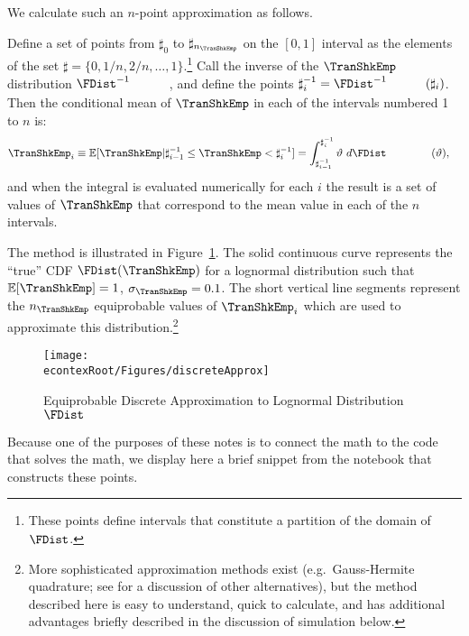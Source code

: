 \documentclass[titlepage, headings=optiontotocandhead]{Resources/texmf-local/tex/latex/econtex}
\begin{document}
We calculate such an $n$-point approximation as follows.

Define a set of points from $\sharp_{0}$ to $\sharp_{n_{\TranShkEmp}}$ on the $[0,1]$ interval
as the elements of the set $\sharp = \{0,1/n,2/n, \ldots,1\}$.\footnote{These points define intervals that constitute a partition of the domain of $\FDist$.}  Call the inverse of the $\TranShkEmp$ distribution $\FDist^{-1}_{\phantom{\TranShkEmp}}$, and define the
points $\sharp^{-1}_{i} = \FDist^{-1}_{\phantom{\TranShkEmp}}(\sharp_{i})$.  Then
the conditional mean of $\TranShkEmp$ in each of the intervals numbered 1 to $n$ is:
\begin{equation}\begin{gathered}\begin{aligned}
      \TranShkEmp_{i} \equiv \Ex[\TranShkEmp | \sharp_{i-1}^{-1} \leq \TranShkEmp < \sharp_{i}^{-1}]  & = \int_{\sharp^{-1}_{i-1}}^{\sharp^{-1}_{i}} \vartheta ~ d\FDist_{\phantom{\TranShkEmp}}(\vartheta)  ,
    \end{aligned}\end{gathered}\end{equation}
and when the integral is evaluated numerically for each $i$ the result is a set of values of $\TranShkEmp$ that correspond to the mean value in each of the $n$ intervals.

The method is illustrated in Figure~\ref{fig:discreteapprox}.  The solid continuous curve represents
the ``true'' CDF $\FDist(\TranShkEmp)$ for a lognormal distribution such that $\Ex[\TranShkEmp] = 1$, $\sigma_{\TranShkEmp} = 0.1$.  The short vertical line segments represent the $n_{\TranShkEmp}$
equiprobable values of $\TranShkEmp_{i}$ which are used to approximate this
distribution.\footnote{More sophisticated approximation methods exist
  (e.g.\ Gauss-Hermite quadrature; see \cite{kopecky2010finite} for a discussion of other alternatives), but the method described here is easy to understand, quick to calculate, and has additional advantages briefly described in the discussion of simulation below.}
  \hypertarget{discreteApprox}{}
  \begin{figure}
    \texttt{[image: \\econtexRoot/Figures/discreteApprox]}
    \caption{Equiprobable Discrete Approximation to Lognormal Distribution $\FDist$}
    \label{fig:discreteapprox}
  \end{figure}


Because one of the purposes of these notes is to connect the math to the code that solves the math, we display here a brief snippet from the notebook that constructs these points.
\end{document}

